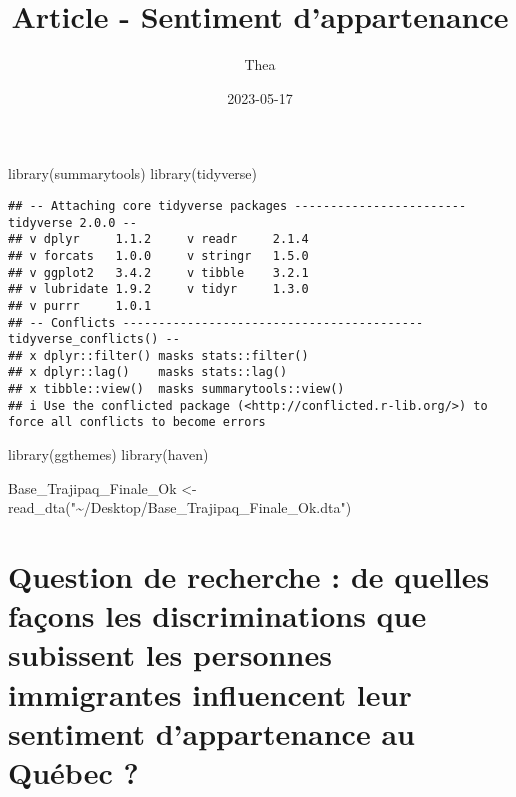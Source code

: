 \documentclass[
]{article}
\title{Article - Sentiment d'appartenance}
\author{Thea}
\date{2023-05-17}
\newenvironment{Shaded}{\begin{snugshade}}{\end{snugshade}}
\newcommand{\FunctionTok}[1]{\textcolor[rgb]{0.00,0.00,0.00}{#1}}
\newcommand{\NormalTok}[1]{#1}
\newcommand{\OtherTok}[1]{\textcolor[rgb]{0.56,0.35,0.01}{#1}}
\newcommand{\StringTok}[1]{\textcolor[rgb]{0.31,0.60,0.02}{#1}}
\begin{document}
\maketitle

\begin{Shaded}
\begin{Highlighting}[]
\FunctionTok{library}\NormalTok{(summarytools)}
\FunctionTok{library}\NormalTok{(tidyverse)}
\end{Highlighting}
\end{Shaded}

\begin{verbatim}
## -- Attaching core tidyverse packages ------------------------ tidyverse 2.0.0 --
## v dplyr     1.1.2     v readr     2.1.4
## v forcats   1.0.0     v stringr   1.5.0
## v ggplot2   3.4.2     v tibble    3.2.1
## v lubridate 1.9.2     v tidyr     1.3.0
## v purrr     1.0.1     
## -- Conflicts ------------------------------------------ tidyverse_conflicts() --
## x dplyr::filter() masks stats::filter()
## x dplyr::lag()    masks stats::lag()
## x tibble::view()  masks summarytools::view()
## i Use the conflicted package (<http://conflicted.r-lib.org/>) to force all conflicts to become errors
\end{verbatim}

\begin{Shaded}
\begin{Highlighting}[]
\FunctionTok{library}\NormalTok{(ggthemes)}
\FunctionTok{library}\NormalTok{(haven)}
\end{Highlighting}
\end{Shaded}

\begin{Shaded}
\begin{Highlighting}[]
\NormalTok{Base\_Trajipaq\_Finale\_Ok }\OtherTok{\textless{}{-}} \FunctionTok{read\_dta}\NormalTok{(}\StringTok{"\textasciitilde{}/Desktop/Base\_Trajipaq\_Finale\_Ok.dta"}\NormalTok{)}
\end{Highlighting}
\end{Shaded}

\hypertarget{question-de-recherche-de-quelles-fauxe7ons-les-discriminations-que-subissent-les-personnes-immigrantes-influencent-leur-sentiment-dappartenance-au-quuxe9bec}{%
\section{Question de recherche : de quelles façons les discriminations
que subissent les personnes immigrantes influencent leur sentiment
d'appartenance au Québec
?}\label{question-de-recherche-de-quelles-fauxe7ons-les-discriminations-que-subissent-les-personnes-immigrantes-influencent-leur-sentiment-dappartenance-au-quuxe9bec}}
\end{document}
